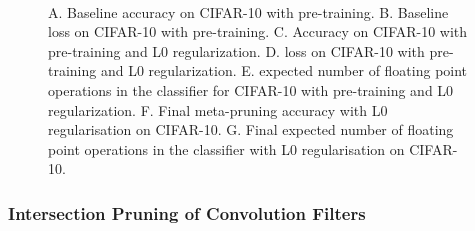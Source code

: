 \documentclass{article}
\begin{document}
\begin{figure}[!t]
{	}
	\\
	\caption{A. Baseline accuracy on CIFAR-10 with pre-training. B. Baseline loss on CIFAR-10 with pre-training.  C. Accuracy on CIFAR-10 with pre-training and L0 regularization. D.  loss on CIFAR-10 with pre-training and L0 regularization. E.  expected number of floating point operations in the classifier for CIFAR-10 with pre-training and L0 regularization. F. Final meta-pruning accuracy with L0 regularisation on CIFAR-10. G. Final expected number of floating point operations in the classifier with L0 regularisation on CIFAR-10.}
	\label{f3}
\end{figure}

\subsubsection{Intersection Pruning of Convolution Filters}
\end{document}
